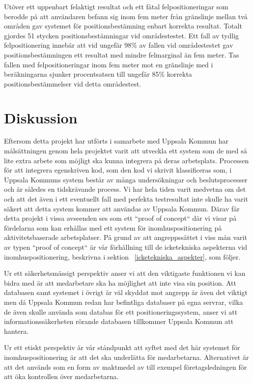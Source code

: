 \documentclass[a4paper,12pt]{article}
\begin{document}
 Utöver ett uppenbart felaktigt resultat och ett fåtal felpositioneringar som berodde på att användaren befann sig inom fem meter från gränslinje mellan två områden gav systemet för positionsbestämning enbart korrekta resultat. Totalt gjordes 51 stycken positionsbestämningar vid områdestestet. Ett fall av tydlig felpositionering innebär att vid ungefär 98\% av fallen vid områdestestet gav positionsbestämningen ett resultat med mindre felmarginal än fem meter. Tas fallen med felpositioneringar inom fem meter mot en gränslinje med i beräkningarna sjunker procentsatsen till ungefär 85\% korrekta positionsbestämmelser vid detta områdestest.

\section{Diskussion}
Eftersom detta projekt har utförts i samarbete med Uppsala Kommun har målsättningen genom hela projektet varit att utveckla ett system som de med så lite extra arbete som möjligt ska kunna integrera på deras arbetsplats. Processen för att integrera egenskriven kod, som den kod vi skrivit klassificeras som, i Uppsala Kommuns system består av många undersökningar och beslutsprocesser och är således en tidskrävande process. Vi har hela tiden varit medvetna om det och att det även i ett eventuellt fall med perfekta testresultat inte skulle ha varit säkert att detta system kommer att användas av Uppsala Kommun. Därav får detta projekt i vissa avseenden ses som ett ``proof of concept`` där vi visar på fördelarna som kan erhållas med ett system för inomhuspositionering på aktivitetsbaserade arbetsplatser. På grund av att angreppssättet i viss mån varit av typen ``proof of concept`` är vår förhållning till de icketekniska aspekterna vid inomhuspositionering, beskrivna i sektion ~\ref{icketekniska_aspekter}, som följer.

Ur ett säkerhetsmässigt perspektiv anser vi att den viktigaste funktionen vi kan bidra med är att medarbetare ska ha möjlighet att inte visa sin position. Att databasen samt systemet i övrigt är väl skyddat mot angrepp är även det viktigt men då Uppsala Kommun redan har befintliga databaser på egna servrar, vilka de även skulle använda som databas för ett positioneringssystem, anser vi att informationssäkerheten rörande databasen tillkommer Uppsala Kommun att hantera.

Ur ett etiskt perspektiv är vår ståndpunkt att syftet med det här systemet för inomhuspositionering är att det ska underlätta för medarbetarna. Alternativet är att det används som en form av maktmedel av till exempel företagsledningen för att öka kontrollen över medarbetarna.
\end{document}
